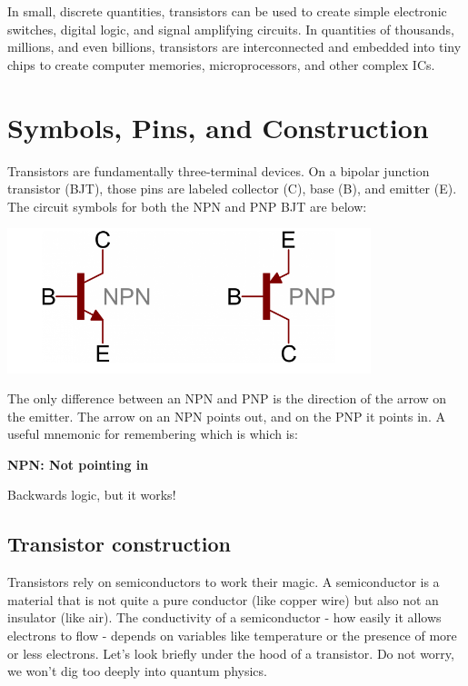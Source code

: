 \documentclass[a4paper, 11pt]{article} %
\begin{document}
In small, discrete quantities, transistors can be used to create simple electronic switches, digital logic, and signal amplifying circuits. In quantities of thousands, millions, and even billions, transistors are interconnected and embedded into tiny chips to create computer memories, microprocessors, and other complex ICs.

\section*{Symbols, Pins, and Construction}

Transistors are fundamentally three-terminal devices. On a bipolar junction transistor (BJT), those pins are labeled collector (C), base (B), and emitter (E). The circuit symbols for both the NPN and PNP BJT are below:

\begin{center}
\includegraphics[width=300pt]{tran2}
\end{center}

The only difference between an NPN and PNP is the direction of the arrow on the emitter. The arrow on an NPN points out, and on the PNP it points in. A useful mnemonic for remembering which is which is:

\begin{center}
\textbf{NPN: Not pointing in}
\end{center}

Backwards logic, but it works!

\subsection*{Transistor construction}

Transistors rely on semiconductors to work their magic. A semiconductor is a material that is not quite a pure conductor (like copper wire) but also not an insulator (like air). The conductivity of a semiconductor - how easily it allows electrons to flow - depends on variables like temperature or the presence of more or less electrons. Let's look briefly under the hood of a transistor. Do not worry, we won't dig too deeply into quantum physics.
\end{document}
